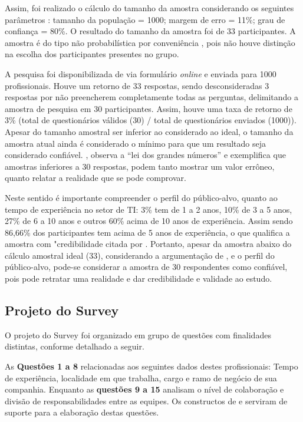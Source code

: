 \documentclass[twoside,english,brazilian]{UNISINOSartigo}
\begin{document}
Assim, foi realizado o cálculo do tamanho da amostra considerando os seguintes parâmetros \cite{SurveyMonkey}: tamanho da população = 1000; margem de erro = 11\%; grau de confiança = 80\%. O resultado do tamanho da amostra foi de 33 participantes. A amostra é do tipo não probabilística por conveniência \cite{Freitas2010}, pois não houve distinção na escolha dos participantes presentes no grupo. 

A pesquisa foi disponibilizada de via formulário \textit{online} e enviada para 1000 profissionais. Houve um retorno de 33 respostas, sendo desconsideradas 3 respostas por não preencherem completamente todas as perguntas, delimitando a amostra de pesquisa em 30 participantes. Assim, houve uma taxa de retorno de 3\% (total de questionários válidos (30) / total de questionários enviados (1000)). Apesar do tamanho amostral ser inferior ao considerado ao ideal, o tamanho da amostra atual ainda é considerado o mínimo para que um resultado seja considerado confiável. , observa a ``lei dos grandes números'' e exemplifica que amostras inferiores a 30 respostas, podem tanto mostrar um valor errôneo, quanto relatar a realidade que se pode comprovar.

Neste sentido é importante compreender o perfil do público-alvo, quanto ao tempo de experiência no setor de TI: 3\% tem de 1 a 2 anos, 10\% de 3 a 5 anos, 27\% de 6 a 10 anos e outros 60\% acima de 10 anos de experiência. Assim sendo 86,66\% dos participantes tem acima de 5 anos de experiência, o que qualifica a amostra com "credibilidade citada por . Portanto, apesar da amostra abaixo do cálculo amostral ideal (33), considerando a argumentação de , e o perfil do público-alvo, pode-se considerar a amostra de 30 respondentes como confiável, pois pode retratar uma realidade e dar credibilidade e validade ao estudo.  

\subsection{Projeto do Survey}

O projeto do Survey foi organizado em grupo de questões com finalidades distintas, conforme detalhado a seguir.

As \textbf{Questões 1 a 8}  relacionadas aos seguintes dados destes profissionais: Tempo de experiência, localidade em que trabalha, cargo e ramo de negócio de sua companhia. Enquanto as \textbf{questões 9 a 15} analisam o nível de colaboração e divisão de responsabilidades entre as equipes. Os constructos de  e  serviram de suporte para a elaboração destas questões.
\end{document}
